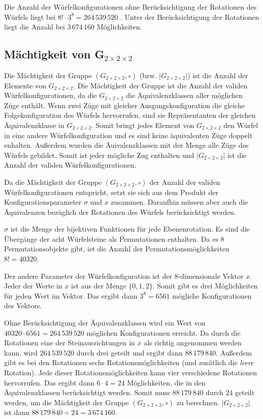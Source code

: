 \documentclass[12pt,a4paper, usenames, dvipsnames]{article}
\theoremstyle{mystyle}
\theoremstyle{definition}
\newcommand{\Gtwo}{\ensuremath{G_{2\times 2\times 2}}}
\begin{document}
Die Anzahl der Würfelkonfigurationen ohne Berücksichtigung der Rotationen des Würfels liegt bei $8! \cdot 3^8 = 264 \, 539 \, 520$ \cite{MMFAA}. Unter der Berücksichtigung der Rotationen liegt die Anzahl bei $3\, 674\, 160$ Möglichkeiten.


%
%
%
%
%
%
%
%
%
%
%
%
%
%
%
%
%
%
%

\subsection{Mächtigkeit von G$_{2\times 2\times 2}$}

Die Mächtigkeit der Gruppe $(\Gtwo,\circ)$ (bzw. $|\Gtwo|$) ist die Anzahl der Elemente von $\Gtwo$. Die Mächtigkeit der Gruppe ist die Anzahl der validen Würfelkonfigurationen, da die $\Gtwo$ die Äquivalenzklassen aller möglichen Züge enthält. Wenn zwei Züge mit gleicher Ausgangskonfiguration die gleiche Folgekonfiguration des Würfels hervorrufen, sind sie Repräsentanten der gleichen Äquivalenzklasse in $\Gtwo$. Somit bringt jedes Element von $\Gtwo$ den Würfel in eine andere Würfelkonfiguration und es sind keine äquivalenten Züge doppelt enhalten. Außerdem wurden die Äuivalenzklassen mit der Menge alle Züge des Würfels gebildet. Somit ist jeder mögliche Zug enthalten und $|\Gtwo|$ ist die Anzahl der validen Würfelkonfigurationen.

Da die Mächtigkeit der Gruppe $(\Gtwo,\circ)$ der Anzahl der validen Würfelkonfigurationen entspricht, setzt sie sich aus dem Produkt der Konfigurationsparameter $\sigma$ und $x$ zusammen. Daraufhin müssen aber auch die Äquivalenzen bezüglich der Rotationen des Würfels berücksichtigt werden.

$\sigma$ ist die Menge der bijektiven Funktionen für jede Ebenenrotation. Es sind die Übergänge der acht Würfelsteine als Permutationen enthalten. Da es $8$ Permutationsobjekte gibt, ist die Anzahl der Permutationsmöglichkeiten $8! = 40320$.

Der andere Parameter der Würfelkonfiguration ist der 8-dimensionale Vektor $x$. Jeder der Werte in $x$ ist aus der Menge $\{0,1,2\}$. Somit gibt es drei Möglichkeiten für jeden Wert im Vektor. Das ergibt dann $3^8 = 6561$ mögliche Konfigurationen des Vektors.

Ohne Berücksichtigung der Äquivalenzklassen wird ein Wert von $40320 \cdot 6561 = 264 \, 539 \, 520$ möglichen Konfigurationen erreicht. Da durch die Rotationen eine der Steinausrichtungen in $x$ als richtig angenommen werden kann, wird $264 \, 539 \, 520$ durch drei geteilt und ergibt dann $88 \, 179 \, 840$. 
Außerdem gibt es bei den Rotationen sechs Rotationsmöglichkeiten (und zusätlich die \textit{leere} Rotation). Jede dieser Rotationsmöglichkeiten kann vier verschiedene Rotationen hervorrufen. Das ergibt dann $6 \cdot 4 = 24$ Möglichkeiten, die in den Äquivalenzklassen berücksichtigt werden. Somit muss $88 \, 179 \, 840$ durch $24$ geteilt werden, um die Mächtigkeit der Gruppe $(\Gtwo,\circ)$ zu berechnen. $|\Gtwo|$ ist dann $88 \, 179 \, 840 \div 24 = 3\, 674\, 160$.
\end{document}
